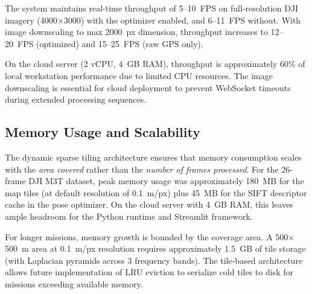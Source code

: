 \documentclass[conference]{IEEEtran}
\begin{document}
The system maintains real-time throughput of 5--10~FPS on full-resolution DJI imagery (4000$\times$3000) with the optimizer enabled, and 6--11~FPS without. With image downscaling to max 2000~px dimension, throughput increases to 12--20~FPS (optimized) and 15--25~FPS (raw GPS only).

\begin{table}[h]
\centering
\caption{Throughput Comparison Across Platforms and Modes}
\label{tab:throughput_comparison}
\end{table}

On the cloud server (2 vCPU, 4~GB RAM), throughput is approximately 60\% of local workstation performance due to limited CPU resources. The image downscaling is essential for cloud deployment to prevent WebSocket timeouts during extended processing sequences.

\subsection{Memory Usage and Scalability}

The dynamic sparse tiling architecture ensures that memory consumption scales with the \textit{area covered} rather than the \textit{number of frames processed}. For the 26-frame DJI M3T dataset, peak memory usage was approximately 180~MB for the map tiles (at default resolution of 0.1~m/px) plus 45~MB for the SIFT descriptor cache in the pose optimizer. On the cloud server with 4~GB RAM, this leaves ample headroom for the Python runtime and Streamlit framework.

For longer missions, memory growth is bounded by the coverage area. A 500$\times$500~m area at 0.1~m/px resolution requires approximately 1.5~GB of tile storage (with Laplacian pyramids across 3 frequency bands). The tile-based architecture allows future implementation of LRU eviction to serialize cold tiles to disk for missions exceeding available memory.
\end{document}
